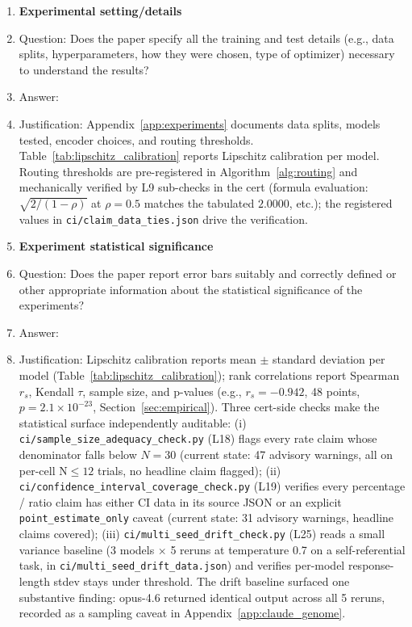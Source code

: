 \begin{enumerate}
\item {\bf Experimental setting/details}
    \item[] Question: Does the paper specify all the training and test details (e.g., data splits, hyperparameters, how they were chosen, type of optimizer) necessary to understand the results?
    \item[] Answer: \answerYes{}
    \item[] Justification: Appendix~\ref{app:experiments} documents data splits, models tested, encoder choices, and routing thresholds. Table~\ref{tab:lipschitz_calibration} reports Lipschitz calibration per model. Routing thresholds are pre-registered in Algorithm~\ref{alg:routing} and mechanically verified by L9 sub-checks in the cert (formula evaluation: $\sqrt{2/(1{-}\rho)}$ at $\rho{=}0.5$ matches the tabulated $2.0000$, etc.); the registered values in \texttt{ci/claim\_data\_ties.json} drive the verification.

\item {\bf Experiment statistical significance}
    \item[] Question: Does the paper report error bars suitably and correctly defined or other appropriate information about the statistical significance of the experiments?
    \item[] Answer: \answerYes{}
    \item[] Justification: Lipschitz calibration reports mean $\pm$ standard deviation per model (Table~\ref{tab:lipschitz_calibration}); rank correlations report Spearman $r_s$, Kendall $\tau$, sample size, and p-values (e.g., $r_s=-0.942$, 48 points, $p=2.1\times10^{-23}$, Section~\ref{sec:empirical}). Three cert-side checks make the statistical surface independently auditable: (i) \texttt{ci/sample\_size\_adequacy\_check.py} (L18) flags every rate claim whose denominator falls below $N{=}30$ (current state: 47 advisory warnings, all on per-cell N${\le}12$ trials, no headline claim flagged); (ii) \texttt{ci/confidence\_interval\_coverage\_check.py} (L19) verifies every percentage / ratio claim has either CI data in its source JSON or an explicit \texttt{point\_estimate\_only} caveat (current state: 31 advisory warnings, headline claims covered); (iii) \texttt{ci/multi\_seed\_drift\_check.py} (L25) reads a small variance baseline (3 models $\times$ 5 reruns at temperature 0.7 on a self-referential task, in \texttt{ci/multi\_seed\_drift\_data.json}) and verifies per-model response-length stdev stays under threshold. The drift baseline surfaced one substantive finding: opus-4.6 returned identical output across all 5 reruns, recorded as a sampling caveat in Appendix~\ref{app:claude_genome}.


\end{enumerate}
